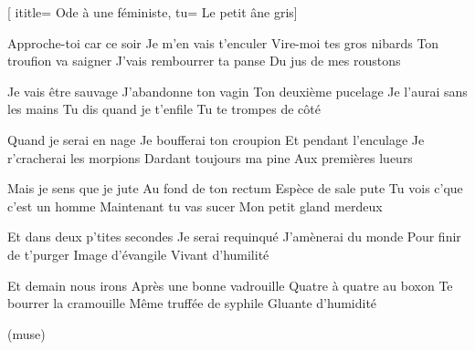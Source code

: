  [
ititle= {Ode à une féministe},
tu= {Le petit âne gris}]


\beginverse
Approche-toi car ce soir
Je m'en vais t'enculer
Vire-moi tes gros nibards
Ton troufion va saigner
J'vais rembourrer ta panse
Du jus de mes roustons
\endverse

\beginverse
Je vais être sauvage
J'abandonne ton vagin
Ton deuxième pucelage
Je l'aurai sans les mains
Tu dis quand je t'enfile
Tu te trompes de côté
\endverse

\beginverse
Quand je serai en nage
Je boufferai ton croupion
Et pendant l'enculage
Je r'cracherai les morpions
Dardant toujours ma pine
Aux premières lueurs
\endverse

\beginverse
Mais je sens que je jute
Au fond de ton rectum
Espèce de sale pute
Tu vois c'que c'est un homme
Maintenant tu vas sucer
Mon petit gland merdeux
\endverse

\beginverse
Et dans deux p'tites secondes
Je serai requinqué
J'amènerai du monde
Pour finir de t'purger
Image d'évangile
Vivant d'humilité
\endverse

\beginverse
Et demain nous irons
Après une bonne vadrouille
Quatre à quatre au boxon
Te bourrer la cramouille
Même truffée de syphile
Gluante d'humidité
\endverse

\beginverse
(muse)
\endverse

\endsong
